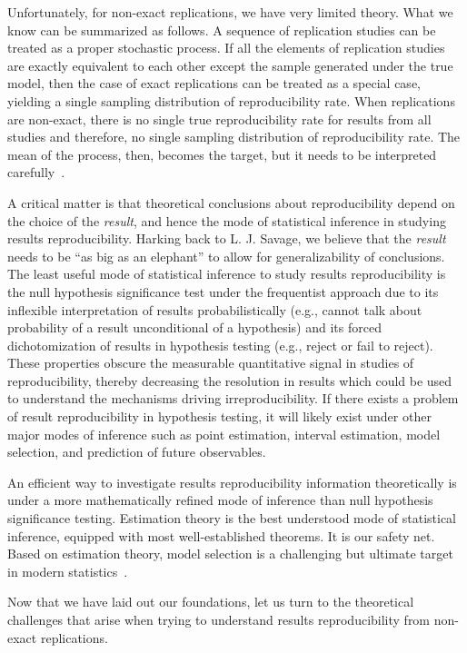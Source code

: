 \documentclass[meta,authordate]{jote-new-article}
\newcounter{result}
\begin{document}
Unfortunately, for non-exact replications, we have very limited theory. What we know  can be summarized as follows. A sequence of replication studies can be treated as a proper stochastic process. If all the elements of replication studies are exactly equivalent to each other except the sample generated under the true model, then the case of exact replications can be treated as a special case, yielding a single sampling distribution of reproducibility rate. When replications are non-exact, there is no single true reproducibility rate for results from all studies and therefore, no single sampling distribution of reproducibility rate. The mean of the process, then, becomes the target, but it needs to be interpreted carefully~\parencite[see][for more information]{Buzbas2023}.

A critical matter is that theoretical conclusions about reproducibility depend on the choice of the {\em result}, and hence the mode of statistical inference in studying results reproducibility. Harking back to L. J. Savage, we believe that the {\em result} needs to be ``as big as an elephant'' to allow for generalizability of conclusions. The least useful mode of statistical inference to study results reproducibility is the null hypothesis significance test under the frequentist approach due to its inflexible interpretation of results probabilistically (e.g., cannot talk about probability of a result unconditional of a hypothesis) and its forced dichotomization of results in hypothesis testing (e.g., reject or fail to reject). These properties obscure the measurable quantitative signal in studies of reproducibility, thereby decreasing the resolution in results which could be used to understand the mechanisms driving irreproducibility. If there exists a problem of result reproducibility in hypothesis testing, it will likely exist under other major modes of inference such as point estimation, interval estimation, model selection, and prediction of future observables.

An efficient way to investigate results reproducibility information theoretically is under a more mathematically refined mode of inference than null hypothesis significance testing. Estimation theory is the best understood mode of statistical inference, equipped with most well-established theorems. It is our safety net. Based on estimation theory, model selection is a challenging but ultimate target in modern statistics~\parencite[as well as in][]{Devezer2019}.

Now that we have laid out our foundations, let us turn to the theoretical challenges that arise when trying to understand results reproducibility from non-exact replications.
\end{document}
